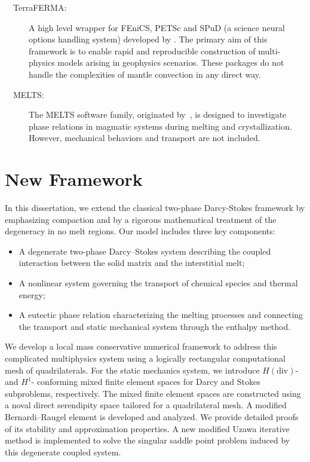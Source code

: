 \begin{description}
\begin{description}
\item [\ \ TerraFERMA:] A high level wrapper for FEniCS,  PETSc and SPuD (a science 
		  neural options handling system) developed by \cite{TerraFerma}. The primary aim 
of this framework is to enable rapid and reproducible construction of 
multi-physics models arising in geophysics scenarios. These packages do
not handle the complexities of mantle convection in any direct way.

\item [\ \ MELTS:] The MELTS software family, originated by~\cite{MELTS},
		  is designed to investigate phase 
		  relations in magmatic systems during 
melting and crystallization.
However, mechanical behaviors and transport are not included. 

\end{description}\vspace*{-6pt}

\section{New Framework}
In this dissertation, we extend the classical two-phase Darcy-Stokes framework
by emphasizing compaction and by a rigorous mathematical treatment of the degeneracy in no melt regions.
Our model includes three key components:
\begin{itemize}
\item A degenerate two-phase Darcy–Stokes system 
describing the coupled interaction between the solid matrix and the interstitial melt;
\item A nonlinear  
system governing the transport of chemical species and thermal energy; 
\item A eutectic phase relation characterizing the melting processes and connecting the transport 
and static mechanical system through the enthalpy method.
\end{itemize}

We develop a local mass conservative numerical framework to address this 
complicated multiphysics system using a logically rectangular computational mesh of quadrilaterals. 
For the static mechanics system, we introduce $H(\text{div})$-and $H^1$- 
conforming mixed finite element spaces for Darcy and Stokes subproblems,
respectively. The mixed finite element spaces are constructed using a noval 
direct serendipity space tailored for a quadrilateral mesh.  
A modified Bernardi–Raugel element is developed and analyzed. 
We provide detailed proofs of its stability and approximation properties.
A new modified Uzawa iterative method is implemented to solve the 
singular saddle 
point problem induced by this degenerate coupled system. 


\end{description}
